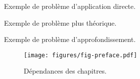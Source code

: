 \begin{Exercise}[counter=preface]
	Exemple de problème d'application directe.
\end{Exercise}
\begin{Exercise}[difficulty=1, counter=preface]
	Exemple de problème plus théorique.
\end{Exercise}
\begin{Exercise}[difficulty=2, counter=preface]
	Exemple de problème d'approfondissement.
\end{Exercise}

\newpage
\begin{figure}
	\centering
	\texttt{[image: figures/fig-preface.pdf]}
	\caption{Dépendances des chapitres.}
\end{figure}
	
